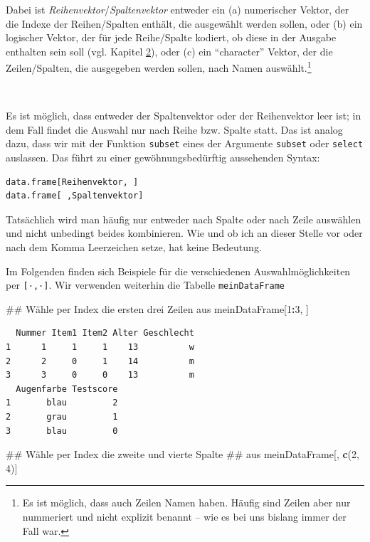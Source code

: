 \documentclass[12pt,]{tufte-book}
\newenvironment{Shaded}{\begin{snugshade}}{\end{snugshade}}
\newcommand{\KeywordTok}[1]{\textcolor[rgb]{0.13,0.29,0.53}{\textbf{#1}}}
\newcommand{\DecValTok}[1]{\textcolor[rgb]{0.00,0.00,0.81}{#1}}
\newcommand{\OperatorTok}[1]{\textcolor[rgb]{0.81,0.36,0.00}{\textbf{#1}}}
\newcommand{\NormalTok}[1]{#1}
\theoremstyle{definition}
\theoremstyle{definition}
\theoremstyle{definition}
\theoremstyle{remark}
\begin{document}
Dabei ist \emph{Reihenvektor}/\emph{Spaltenvektor} entweder ein (a)
numerischer Vektor, der die Indexe der Reihen/Spalten enthält, die
ausgewählt werden sollen, oder (b) ein logischer Vektor, der für jede
Reihe/Spalte kodiert, ob diese in der Ausgabe enthalten sein soll (vgl.
Kapitel \protect\hyperlink{logischerZugriff}{2}), oder (c) ein
``character'' Vektor, der die Zeilen/Spalten, die ausgegeben werden
sollen, nach Namen auswählt.\footnote{Es ist möglich, dass auch Zeilen
  Namen haben. Häufig sind Zeilen aber nur nummeriert und nicht explizit
  benannt -- wie es bei uns bislang immer der Fall war.}

~

Es ist möglich, dass entweder der Spaltenvektor oder der Reihenvektor
leer ist; in dem Fall findet die Auswahl nur nach Reihe bzw. Spalte
statt. Das ist analog dazu, dass wir mit der Funktion \texttt{subset}
eines der Argumente \texttt{subset} oder \texttt{select} auslassen. Das
führt zu einer gewöhnungsbedürftig aussehenden Syntax:

\begin{verbatim}
data.frame[Reihenvektor, ]
data.frame[ ,Spaltenvektor]
\end{verbatim}

Tatsächlich wird man häufig nur entweder nach Spalte oder nach Zeile
auswählen und nicht unbedingt beides kombinieren. Wie und ob ich an
dieser Stelle vor oder nach dem Komma Leerzeichen setze, hat keine
Bedeutung.

Im Folgenden finden sich Beispiele für die verschiedenen
Auswahlmöglichkeiten per \texttt{{[}·,·{]}}. Wir verwenden weiterhin die
Tabelle \texttt{meinDataFrame}

\begin{Shaded}
\begin{Highlighting}[]
\NormalTok{## Wähle per Index die ersten drei Zeilen aus}
\NormalTok{meinDataFrame[}\DecValTok{1}\OperatorTok{:}\DecValTok{3}\NormalTok{, ]}
\end{Highlighting}
\end{Shaded}

\begin{verbatim}
  Nummer Item1 Item2 Alter Geschlecht
1      1     1     1    13          w
2      2     0     1    14          m
3      3     0     0    13          m
  Augenfarbe Testscore
1       blau         2
2       grau         1
3       blau         0
\end{verbatim}

\begin{Shaded}
\begin{Highlighting}[]
\NormalTok{## Wähle per Index die zweite und vierte Spalte}
\NormalTok{## aus}
\NormalTok{meinDataFrame[, }\KeywordTok{c}\NormalTok{(}\DecValTok{2}\NormalTok{, }\DecValTok{4}\NormalTok{)]}
\end{Highlighting}
\end{Shaded}
\end{document}
